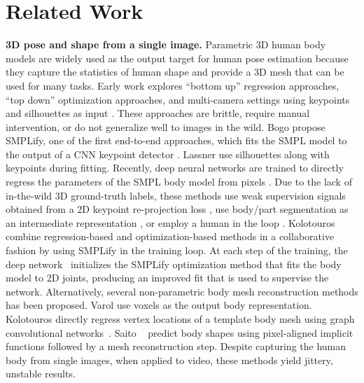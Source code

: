 \documentclass[10pt,twocolumn,letterpaper]{article}
\begin{document}
\section{Related Work}
\label{related_work}

{\bf 3D pose and shape from a single image.} 
Parametric 3D human body models \cite{scape,looper_smpl,SMPL-X:2019} are widely used as the output target for human pose estimation because they capture the statistics of human shape and provide a 3D mesh that can be used for many tasks.
Early work explores ``bottom up'' regression approaches, ``top down'' optimization approaches, and multi-camera settings using keypoints and silhouettes as input
 \cite{agarwal2006recovering,balan2008,grauman2003inferring,sigal2008combined}.
These approaches are brittle, require manual intervention, or do not generalize well to images in the wild.
Bogo \etal \cite{bogo_smplify} propose SMPLify, one of the first end-to-end approaches, which fits the SMPL model to the output of a CNN keypoint detector \cite{Leonid2016DeepCut}. Lassner \etal \cite{lassner_up3d} use silhouettes along with keypoints during fitting. Recently, deep neural networks are trained to directly regress the parameters of the SMPL body model from pixels \cite{Guler_2019_CVPR,kanazawa_hmr,omran2018nbf,pavlakos2018humanshape,Tan,tung2017self}. 
Due to the lack of in-the-wild 3D ground-truth labels, these methods use weak supervision signals obtained from a 2D keypoint re-projection loss \cite{kanazawa_hmr,Tan,tung2017self}, use body/part segmentation as an intermediate representation \cite{omran2018nbf,pavlakos2018humanshape}, or employ a human in the loop \cite{lassner_up3d}. Kolotouros \etal~\cite{SPIN:ICCV:2019} combine regression-based and optimization-based methods in a collaborative fashion by using SMPLify in the training loop. At each step of the training, the deep network~\cite{kanazawa_hmr} initializes the SMPLify optimization method that fits the body model to 2D joints, producing an improved fit that is used to supervise the network. Alternatively, several non-parametric body mesh reconstruction methods \cite{kolotouros2019cmr,pifu,varol_bodynet} has been proposed. Varol \etal \cite{varol_bodynet} use voxels as the output body representation. Kolotouros \etal \cite{kolotouros2019cmr} directly regress vertex locations of a template body mesh using graph convolutional networks~\cite{kipf2017semi}. Saito \etal~\cite{pifu} predict body shapes using pixel-aligned implicit functions followed by a mesh reconstruction step. Despite capturing the human body from single images, when applied to video, these methods yield jittery, unstable results. 
\end{document}
